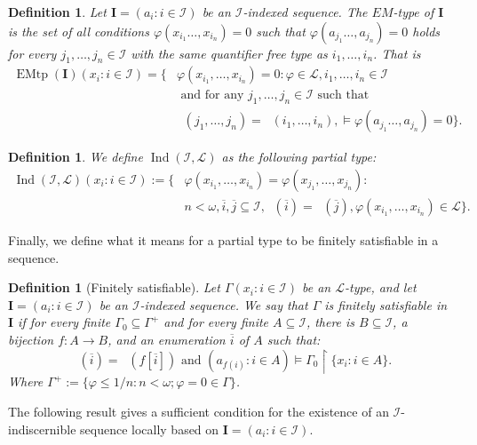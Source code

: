 \documentclass{amsart}
\newtheorem{defin}[teor]{Definition}
\newtheorem{external claim}[teor]{Claim}
\newcommand{\mL}{\mathcal{L}}
\newcommand{\I}{\mathcal{I}}
\newcommand{\II}{\mathbf{I}}
\DeclareMathOperator{\qftp}{{tp^{qf}}}
\DeclareMathOperator{\emtp}{{EMtp}}
\DeclareMathOperator{\Ind}{{Ind}}
\begin{document}
\begin{defin}%
Let $\II=(a_i:i\in \I)$ be an $\I$-indexed sequence. The \emph{$EM$-type of $\II$} is the set of all conditions $\varphi(x_{i_1}\dots,x_{i_n})=0$ such that $\varphi(a_{j_1}\dots,a_{j_n})=0$ holds for every $j_1,\dots,j_n\in \I$ with the same quantifier free type as $i_1,\dots,i_n$. That is \begin{align*}
    \emtp(\II)(x_i: i\in \I)=\{& \varphi(x_{i_1},\dots,x_{i_n})=0 :  \varphi \in \mL, i_1,\dots,i_n\in \I  \\ &\text{ and for any } j_1,\dots,j_n\in \I  \text{ such that } \\ &\qftp(j_1,\dots,j_n)=\qftp(i_1,\dots,i_n),   \models\varphi(a_{j_1}\dots,a_{j_n})=0 \}.
\end{align*}
\end{defin}

\begin{defin}%
    We define $\Ind(\I,\mL)$ as the following partial type:
    \begin{align*}
       \Ind(\I,\mL)(x_i:i\in \I):= \{& \varphi(x_{i_1},\dots,x_{i_n})= \varphi(x_{j_1},\dots,x_{j_n}):&\\
        & n<\omega, \overline{i}, \overline{j}\subseteq \I, \qftp(\overline{i})=\qftp(\overline{j}), \varphi(x_{i_1},\dots,x_{i_n})\in \mL\}.
    \end{align*}
\end{defin}

Finally, we define what it means for a partial type to be finitely satisfiable in a sequence. 

\begin{defin}[Finitely satisfiable] Let $\Gamma(x_i:i\in \I)$ be an $\mL$-type, and let $\II=(a_i:i\in \I)$ be an $\I$-indexed sequence. We say that $\Gamma$ is \emph{finitely satisfiable in $\II$} if for every finite $\Gamma_0\subseteq \Gamma^+$ and for every finite $A\subseteq \I$, there is $B\subseteq \I$, a bijection $f:A\to B$, and an enumeration $\overline{i}$ of $A$ such that:
$$ \qftp(\overline{i})=\qftp(f[\overline{i}])\text{ and } (a_{f(i)}:i\in A)\models \Gamma_0\upharpoonright \{x_i: i\in A\}. $$ 
Where $\Gamma^+:=\{ \varphi \leq 1/n: n<\omega ; \varphi=0\in \Gamma\}$.
\end{defin}

The following result gives a sufficient condition for the existence of an $\I$-indiscernible sequence locally based on $\II=(a_i:i\in \I)$.
\end{document}
